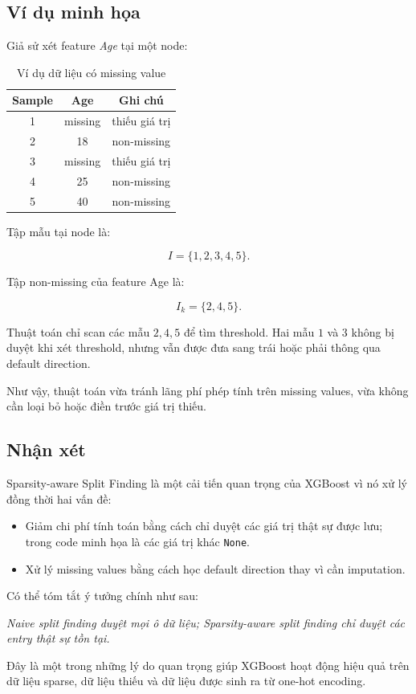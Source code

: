 \subsection{Ví dụ minh họa}

Giả sử xét feature \textit{Age} tại một node:

\begin{table}[htbp]
    \centering
    \caption{Ví dụ dữ liệu có missing value}
    \label{tab:sparsity_example}
    \begin{tabular}{ccc}
        \toprule
        \textbf{Sample} & \textbf{Age} & \textbf{Ghi chú} \\
        \midrule
        1 & missing & thiếu giá trị \\
        2 & 18 & non-missing \\
        3 & missing & thiếu giá trị \\
        4 & 25 & non-missing \\
        5 & 40 & non-missing \\
        \bottomrule
    \end{tabular}
\end{table}

Tập mẫu tại node là:

\[
I = \{1,2,3,4,5\}.
\]

Tập non-missing của feature Age là:

\[
I_k = \{2,4,5\}.
\]

Thuật toán chỉ scan các mẫu $2,4,5$ để tìm threshold. Hai mẫu $1$ và $3$ không bị duyệt khi xét threshold, nhưng vẫn được đưa sang trái hoặc phải thông qua default direction.

Như vậy, thuật toán vừa tránh lãng phí phép tính trên missing values, vừa không cần loại bỏ hoặc điền trước giá trị thiếu.

\subsection{Nhận xét}

Sparsity-aware Split Finding là một cải tiến quan trọng của XGBoost vì nó xử lý đồng thời hai vấn đề:

\begin{itemize}
    \item Giảm chi phí tính toán bằng cách chỉ duyệt các giá trị thật sự được lưu; trong code minh họa là các giá trị khác \texttt{None}.
    \item Xử lý missing values bằng cách học default direction thay vì cần imputation.
\end{itemize}

Có thể tóm tắt ý tưởng chính như sau:

\begin{center}
\textit{Naive split finding duyệt mọi ô dữ liệu; Sparsity-aware split finding chỉ duyệt các entry thật sự tồn tại.}
\end{center}

Đây là một trong những lý do quan trọng giúp XGBoost hoạt động hiệu quả trên dữ liệu sparse, dữ liệu thiếu và dữ liệu được sinh ra từ one-hot encoding.
